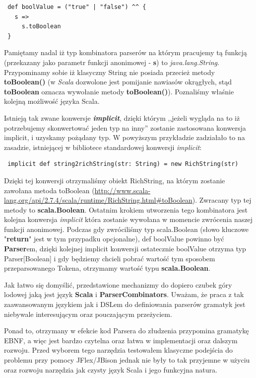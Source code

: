 \documentclass[a4paper]{article}
\begin{document}
\begin{verbatim}
 def boolValue = ("true" | "false") ^^ {
   s =>
     s.toBoolean
 }
\end{verbatim}

Pamiętamy nadal iż typ kombinatora parserów na którym pracujemy tą funkcją (przekazany jako parametr funkcji anonimowej - \textbf{s})
to \textit{java.lang.String}. Przypominamy sobie iż klasyczny String nie posiada przecież metody \textbf{toBoolean()} (w \textit{Scala} dozwolone jest 
pomijanie nawiasów okrągłych, stąd \textbf{toBoolean} oznacza wywołanie metody \textbf{toBoolean()}). Poznaliśmy właśnie kolejną możliwość języka Scala.

Istnieją tak zwane konwersje \textbf{\textit{implicit}}, dzięki którym ,,jeżeli wygląda na to iż potrzebujemy skonwertować jeden typ na inny'' zostanie zastosowana
konwersja implicit, i uzyskamy pożądany typ. W powyższym przykładzie zadziałało to na zasadzie, istniejącej w bibliotece standardowej konwersji \textit{implicit}:

\begin{verbatim}
 implicit def string2richString(str: String) = new RichString(str)
\end{verbatim}

Dzięki tej konwersji otrzymaliśmy obiekt RichString, na którym zostanie zawołana metoda toBoolean (\url{http://www.scala-lang.org/api/2.7.4/scala/runtime/RichString.html#toBoolean}).
Zwracany typ tej metody to \textbf{scala.Boolean}. Ostatnim krokiem utworzenia tego kombinatora jest kolejna konwersja \textit{implicit} która zostanie 
wywołana w momencie zwrócenia naszej funkcji anonimowej. Podczas gdy zwróciliśmy typ scala.Boolean (słowo kluczowe "\textbf{return}" jest w tym przypadku opcjonalne),
def boolValue powinno być \textbf{Parser}em, dzięki kolejnej implicit konwersji ostatecznie boolValue otrzyma typ Parser[Boolean] i gdy będziemy chcieli pobrać wartość 
tym sposobem przeparsowanego Tokena, otrzymamy wartość typu \textbf{scala.Boolean}. 

Jak łatwo się domyślić, przedstawione mechanizmy do dopiero czubek góry lodowej jaką jest język \textbf{Scala} i \textbf{ParserCombinators}.
Uważam, że praca z tak zaawansowanym językiem jak i DSLem do definiowania parserów gramatyk jest niebywale interesującym oraz pouczającym przeżyciem.

Ponad to, otrzymany w efekcie kod Parsera do złudzenia przypomina gramatykę EBNF, a więc jest bardzo czytelna oraz łatwa w implementacji oraz dalszym rozwoju.
Przed wyborem tego narzędzia testowałem klasyczne podejścia do problemu przy pomocy JFlex/JBison jednak nie były to tak przyjemne w użyciu oraz rozwoju narzędzia 
jak czysty język Scala i jego funkcyjna natura.
\end{document}
